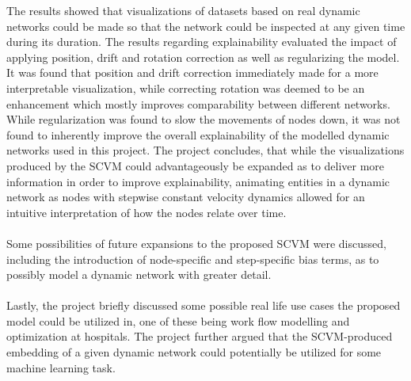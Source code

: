The results showed that visualizations of datasets based on real dynamic networks could be made so that the network could be inspected at any given time during its duration.
The results regarding explainability evaluated the impact of applying position, drift and rotation correction as well as regularizing the model.
It was found that position and drift correction immediately made for a more interpretable visualization, while correcting rotation was deemed to be an enhancement which mostly improves comparability between different networks.
While regularization was found to slow the movements of nodes down, it was not found to inherently improve the overall explainability of the modelled dynamic networks used in this project.
The project concludes, that while the visualizations produced by the SCVM could advantageously be expanded as to deliver more information in order to improve explainability, animating entities in a dynamic network as nodes with stepwise constant velocity dynamics allowed for an intuitive interpretation of how the nodes relate over time. 
\\\\
Some possibilities of future expansions to the proposed SCVM were discussed, including the introduction of node-specific and step-specific bias terms, as to possibly model a dynamic network with greater detail.
\\\\
Lastly, the project briefly discussed some possible real life use cases the proposed model could be utilized in, one of these being work flow modelling and optimization at hospitals. 
The project further argued that the SCVM-produced embedding of a given dynamic network could potentially be utilized for some machine learning task. 

